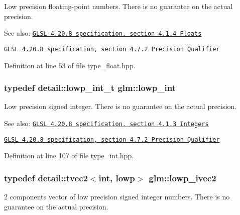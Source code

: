 Low precision floating-point numbers. There is no guarantee on the actual precision.

\begin{Desc}
\item[See also:]\href{http://www.opengl.org/registry/doc/GLSLangSpec.4.20.8.pdf}{\tt GLSL 4.20.8 specification, section 4.1.4 Floats} 

\href{http://www.opengl.org/registry/doc/GLSLangSpec.4.20.8.pdf}{\tt GLSL 4.20.8 specification, section 4.7.2 Precision Qualifier} \end{Desc}


Definition at line 53 of file type\_\-float.hpp.\hypertarget{group__core__precision_g4681244bf4a184734f03aa9df4e3d288}{
\subsubsection[lowp\_\-int]{\setlength{\rightskip}{0pt plus 5cm}typedef detail::lowp\_\-int\_\-t {\bf glm::lowp\_\-int}}}
\label{group__core__precision_g4681244bf4a184734f03aa9df4e3d288}


Low precision signed integer. There is no guarantee on the actual precision.

\begin{Desc}
\item[See also:]\href{http://www.opengl.org/registry/doc/GLSLangSpec.4.20.8.pdf}{\tt GLSL 4.20.8 specification, section 4.1.3 Integers} 

\href{http://www.opengl.org/registry/doc/GLSLangSpec.4.20.8.pdf}{\tt GLSL 4.20.8 specification, section 4.7.2 Precision Qualifier} \end{Desc}


Definition at line 107 of file type\_\-int.hpp.\hypertarget{group__core__precision_g562c5c67d6431ab88fc4a032239e2137}{
\subsubsection[lowp\_\-ivec2]{\setlength{\rightskip}{0pt plus 5cm}typedef detail::tvec2$<$int, lowp$>$ {\bf glm::lowp\_\-ivec2}}}
\label{group__core__precision_g562c5c67d6431ab88fc4a032239e2137}


2 components vector of low precision signed integer numbers. There is no guarantee on the actual precision.

